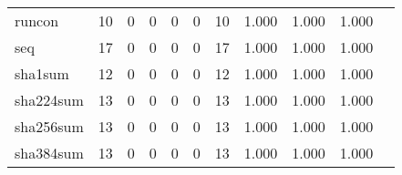 \begin{longtable}{lp{1.2cm}p{1.2cm}p{1.2cm}p{1.2cm}p{1.2cm}p{1.2cm}p{1.2cm}p{1.2cm}p{1.2cm}p{1.2cm}}
runcon    &                                    10 &                                                  0 &                                                  0 &                                                  0 &                                                  0 &                                                 10 &                                         1.000 &                                              1.000 &                                              1.000 \\
seq       &                                    17 &                                                  0 &                                                  0 &                                                  0 &                                                  0 &                                                 17 &                                         1.000 &                                              1.000 &                                              1.000 \\
sha1sum   &                                    12 &                                                  0 &                                                  0 &                                                  0 &                                                  0 &                                                 12 &                                         1.000 &                                              1.000 &                                              1.000 \\
sha224sum &                                    13 &                                                  0 &                                                  0 &                                                  0 &                                                  0 &                                                 13 &                                         1.000 &                                              1.000 &                                              1.000 \\
sha256sum &                                    13 &                                                  0 &                                                  0 &                                                  0 &                                                  0 &                                                 13 &                                         1.000 &                                              1.000 &                                              1.000 \\
sha384sum &                                    13 &                                                  0 &                                                  0 &                                                  0 &                                                  0 &                                                 13 &                                         1.000 &                                              1.000 &                                              1.000 \\

\end{longtable}
